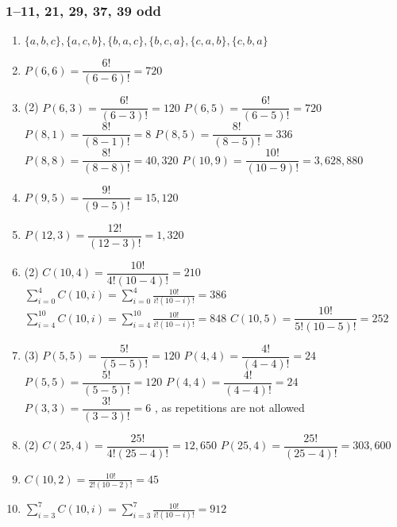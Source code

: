 \documentclass[12pt, A4]{article}
\begin{document}
			\subsubsection*{1--11, 21, 29, 37, 39 odd}
				\begin{enumerate}
					\item
						\(\{a, b, c\}, \{a, c, b\}, \{b, a, c\}, \{b, c, a\}, \{c, a, b\}, \{c, b, a\}\)
					\setcounter{enumi}{2}
					\item
						\(P(6, 6) = \dfrac{6!}{(6 - 6)!} = 720\)
					\setcounter{enumi}{4}
					\item
						\begin{tasks}(2)
							\task
								\(P(6, 3) = \dfrac{6!}{(6 - 3)!} = 120\)
							\task
								\(P(6, 5) = \dfrac{6!}{(6 - 5)!} = 720\)
							\task
								\(P(8, 1) = \dfrac{8!}{(8 - 1)!} = 8\)
							\task
								\(P(8, 5) = \dfrac{8!}{(8 - 5)!} = 336\)
							\task
								\(P(8, 8) = \dfrac{8!}{(8 - 8)!} = 40,320\)
							\task
								\(P(10, 9) = \dfrac{10!}{(10 - 9)!} = 3,628,880\) 
						\end{tasks}
					\setcounter{enumi}{6}
					\item
						\(P(9, 5) = \dfrac{9!}{(9 - 5)!} = 15,120\)
					\setcounter{enumi}{8}
					\item
						\(P(12, 3) = \dfrac{12!}{(12 - 3)!} = 1,320\)
					\setcounter{enumi}{10}
					\item
						\begin{tasks}(2)
							\task
								\(C(10, 4) = \dfrac{10!}{4!(10 - 4)!} = 210\)
							\task
								\(\displaystyle \sum_{i = 0}^4 C(10, i) = \sum_{i = 0}^4 \frac{10!}{i!(10 - i)!} = 386\)
							\task
								\(\displaystyle \sum_{i = 4}^{10} C(10, i) = \sum_{i = 4}^{10} \frac{10!}{i!(10 - i)!} = 848\)
							\task
								\(C(10, 5) = \dfrac{10!}{5!(10 - 5)!} = 252\)
						\end{tasks}
					\setcounter{enumi}{20}
					\item
						\begin{tasks}(3)
							\task
								\(P(5, 5) = \dfrac{5!}{(5 - 5)!} = 120\)	
							\task
								\(P(4, 4) = \dfrac{4!}{(4 - 4)!} = 24\)
							\task
								\(P(5, 5) = \dfrac{5!}{(5 - 5)!} = 120\)
							\task
								\(P(4, 4) = \dfrac{4!}{(4 - 4)!} = 24\)
							\task
								\(P(3, 3) = \dfrac{3!}{(3 - 3)!} = 6\)
							, as repetitions are not allowed
						\end{tasks}
					\setcounter{enumi}{28}
					\item
						\begin{tasks}(2)
							\task
								\(C(25, 4) = \dfrac{25!}{4!(25 - 4)!} = 12,650\)
							\task
								\(P(25, 4) = \dfrac{25!}{(25 - 4)!} = 303,600\)
						\end{tasks}
					\setcounter{enumi}{36}
					\item
						\(C(10, 2) = \frac{10!}{2!(10 - 2)!} = 45\)
					\setcounter{enumi}{38}
					\item
						\(\displaystyle \sum_{i = 3}^{7}C(10, i) = \sum_{i = 3}^7 \frac{10!}{i!(10 - i)!} = 912\)
				\end{enumerate}
		\setcounter{subsection}{3}
\end{document}
